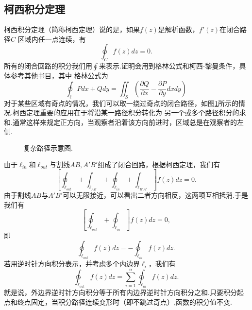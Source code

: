 \subsection{柯西积分定理}
\label{subsec:cauchy_theorem}
柯西积分定理（简称柯西定理）说的是，如果$f(z)$是解析函数，$f'(z)$在闭合路径$C$%
区域内任一点连续，有
\begin{equation}
    \oint_C f(z) dz = 0.
\end{equation}
所有的闭合回路的积分我们用$\oint$来表示.证明会用到格林公式和柯西-黎曼条件，具体参考其他书目，其中
格林公式为
\begin{equation}
    \oint_\ell P dx + Q dy = \iint_S \left( \frac{\partial Q}{\partial x} - \frac{\partial P}{\partial y} dx dy \right)
\end{equation}
对于某些区域有奇点的情况，我们可以取一绕过奇点的闭合路径，如图\ref{fig:complexregion}所示的情况.柯西定理重要的应用在于将沿某一路径积分转化为
另一个或多个路径积分的求和.通常这样来规定正方向，当观察者沿着该方向前进时，区域总是在观察者的左侧.
\begin{figure}
    \centering
    
    \caption{复杂路径示意图.}
    \label{fig:complexregion}
\end{figure}
由于$\ell_{in}$和$\ell_{out}$与割线$AB,A'B'$组成了闭合回路，根据柯西定理，我们有
\[
    \left[ \oint _{\ell_{out}} + \int _{\ell_{AB}} + \oint _{\ell_{in}} + \int _{\ell_{B'A'}} \right] f(z) dz = 0 .
\]   
由于割线$AB$与$A'B'$可以无限接近，可以看出二者方向相反，这两项互相抵消.于是我们有
\[
    \left[ \oint _{\ell_{out}} + \oint _{\ell_{in}}  \right] f(z) dz = 0,
\]
即
\[
    \oint_{\ell_{out}} f(z) dz = - \oint _{\ell_{in}}f(z) dz .
\]
若用逆时针方向积分表示，并考虑多个内边界$\ell_{i}$，我们有
\begin{equation}
    \ointctrclockwise_{\ell_{out}} f(z) dz = \sum_{i=1}^{n} \ointctrclockwise_{\ell_{in}} f(z) dz .
\end{equation}
就是说，外边界逆时针方向积分等于所有内边界逆时针方向积分之和.只要积分起点和终点固定，当积分路径连续变形时（即不跳过奇点）,函数的积分值不变.

